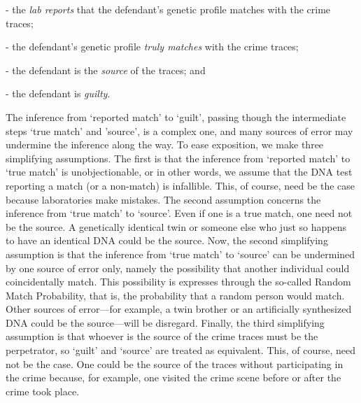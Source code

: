 \documentclass[10pt]{article}
\begin{document}
- the \textit{lab reports} that the defendant's 
genetic profile matches with the crime traces;

- the defendant's genetic profile \textit{truly matches} with the crime traces; 

- the defendant is the \textit{source} of the traces; and




- the defendant is \textit{guilty}.

\noindent
The inference from `reported match'  
to `guilt', passing though the intermediate steps `true match' and 'source', is a complex one, 
and many sources of error may undermine the inference along the way.  
To ease exposition, we make three simplifying 
assumptions. The first is that the inference from `reported match' to `true match' is unobjectionable, or in other words, we assume that 
the DNA test reporting a match (or a non-match) is infallible. This, of course, need be the case because laboratories make mistakes.
The second assumption concerns the inference from `true match' to `source'.
Even if one is a true match, one need not be the source. A genetically identical twin or someone else 
who just so happens to have an identical DNA could be the source. 
Now, the second simplifying 
assumption is that the inference from `true match' to `source' can be undermined by 
one source of error only, namely the possibility that another individual 
could coincidentally match. This possibility is expresses through the so-called 
Random Match Probability, that is, the probability that a random person would match. 
Other sources of error---for example, a twin brother or an artificially synthesized DNA could be the source---will be disregard. 
Finally, the third  simplifying assumption is that whoever is the source of the crime traces must be the perpetrator, 
so `guilt' and `source' are treated as equivalent. 
 This, of course, need not be the case. One could be the source of the traces without participating in the crime because, for example, 
 one visited the crime scene before or after 
 the crime took place.
 
\end{document}
